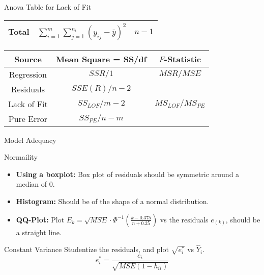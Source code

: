 \documentclass{article}
\begin{document}
\begin{multicols*}{3}
\begin{blackbox}{Anova Table for Lack of Fit}
\begin{center}
\begin{tabular}{|c|c|c|}
                \hline
                Total & $\sum\limits_{i=1}^m\sum\limits_{j=1}^{n_i}(y_{ij} - \bar{y})^2$ & $n-1$  \\
                \hline
            \end{tabular}
        \end{center}
        \renewcommand{\arraystretch}{1.5}
        \begin{center}            
            \begin{tabular}{|c|c|c|}
                \hline
                Source & Mean Square = SS/df & $F$-Statistic\\
                \hline 
                \hline 
                Regression & $SSR/1$ & $MSR/MSE$ \\
                \hline
                Residuals & $SSE(R)/n-2$ & \\
                \hline
                Lack of Fit & $SS_{LOF}/m-2$ & $MS_{LOF}/MS_{PE}$\\
                \hline
                Pure Error & $SS_{PE}/n-m$ & \\
                \hline
            \end{tabular}
        \end{center}
    \end{blackbox}
    \begin{blackbox}{Model Adequacy}
        \begin{pinkbox}{Normaility}
            
                \begin{itemize}[leftmargin=7pt]
                    \item \textbf{Using a boxplot:} Box plot of residuals should be symmetric around a median of 0.
                    \item \textbf{Histogram:} Should be of the shape of a normal distribution.
                    \item \textbf{QQ-Plot:} Plot $E_k = \sqrt{MSE}\cdot\Phi^{-1}\left(\frac{k-0.375}{n + 0.25}\right)$ vs the residuals $e_{(k)}$, should be a straight line.
                \end{itemize}
        \end{pinkbox}
        \begin{redbox}{Constant Variance}
            Studentize the residuals, and plot $\sqrt{e_i^*}$ vs $\hat{Y}_i$.\\[-0.25ex]
            \[e_i^* = \frac{e_i}{\sqrt{MSE(1-h_{ii})}}\]
            

\end{redbox}
\end{blackbox}
\end{multicols*}
\end{document}
